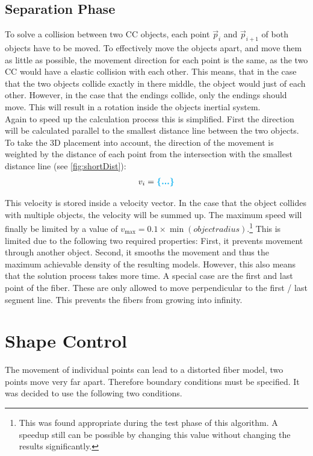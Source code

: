 \subsection{Separation Phase}
To solve a collision between two \ac{CC} objects, each point $\vec{p}_i$ and $\vec{p}_{i+1}$ of both objects have to be moved.
To effectively move the objects apart, and move them as little as possible, the movement direction for each point is the same, as the two \ac{CC} would have a elastic collision with each other.
This means, that in the case that the two objects collide exactly in there middle, the object would just  of each other.
However, in the case that the endings collide, only the endings should move. 
This will result in a rotation inside the objects inertial system.
\\
Again to speed up the calculation process this is simplified.
First the direction will be calculated parallel to the smallest distance line between the two objects.
To take the 3D placement into account, the direction of the movement is weighted by the distance of each point from the intersection with the smallest distance line (see \cref{fig:shortDist}):
\begin{align}
v_i = \dummy{}
\end{align}
\par
% 
This velocity is stored inside a velocity vector.
In the case that the object collides with multiple objects, the velocity will be summed up.
The maximum speed will finally be limited by a value of $v_{\max} = 0.1 \times \min(\mathit{object radius})$.\footnote{This was found appropriate during the test phase of this algorithm. A speedup still can be possible by changing this value without changing the results significantly.}
This is limited due to the following two required properties:
First, it prevents movement through another object.
Second, it smooths the movement and thus the maximum achievable density of the resulting models.
However, this also means that the solution process takes more time.
A special case are the first and last point of the fiber.
These are only allowed to move perpendicular to the first / last segment line.
This prevents the fibers from growing into infinity.
% 
\section{Shape Control}\label{chap5:ShapeControl}
The movement of individual points can lead to a distorted fiber model, \eg{} two points move very far apart.
Therefore boundary conditions must be specified.
It was decided to use the following two conditions.
% 
